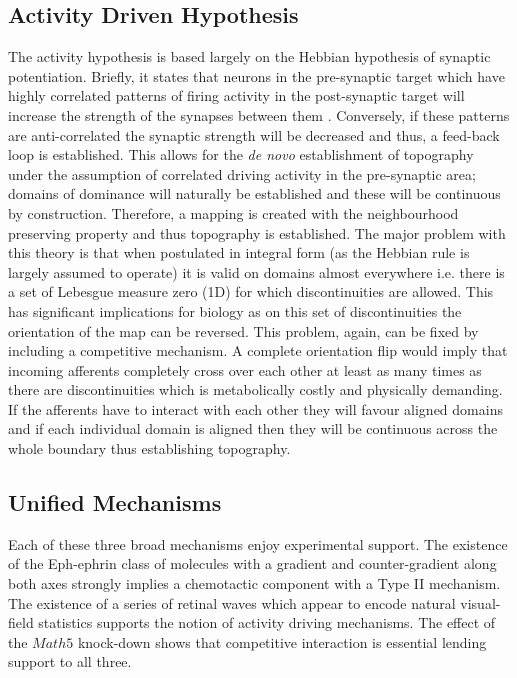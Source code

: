 \subsection{Activity Driven Hypothesis}
The activity hypothesis is based largely on the Hebbian hypothesis of synaptic potentiation. Briefly, it states that neurons in the pre-synaptic target which have highly correlated patterns of firing activity in the post-synaptic target will increase the strength of the synapses between them \cite{Hebb1949-wr}. Conversely, if these patterns are anti-correlated the synaptic strength will be decreased and thus, a feed-back loop is established. This allows for the \textit{de novo} establishment of topography under the assumption of correlated driving activity in the pre-synaptic area; domains of dominance will naturally be established and these will be continuous by construction. Therefore, a mapping is created with the neighbourhood preserving property and thus topography is established. The major problem with this theory is that when postulated in integral form (as the Hebbian rule is largely assumed to operate) it is valid on domains almost everywhere i.e. there is a set of Lebesgue measure zero (1D) for which discontinuities are allowed. This has significant implications for biology as on this set of discontinuities the orientation of the map can be reversed. This problem, again, can be fixed by including a competitive mechanism. A complete orientation flip would imply that incoming afferents completely cross over each other at least as many times as there are discontinuities which is metabolically costly and physically demanding. If the afferents have to interact with each other they will favour aligned domains and if each individual domain is aligned then they will be continuous across the whole boundary thus establishing topography.

\subsection{Unified Mechanisms}
Each of these three broad mechanisms enjoy experimental support. The existence of the Eph-ephrin class of molecules with a gradient and counter-gradient along both axes strongly implies a chemotactic component with a Type II mechanism. The existence of a series of retinal waves which appear to encode natural visual-field statistics supports the notion of activity driving mechanisms. The effect of the $Math5$ knock-down shows that competitive interaction is essential lending support to all three.

